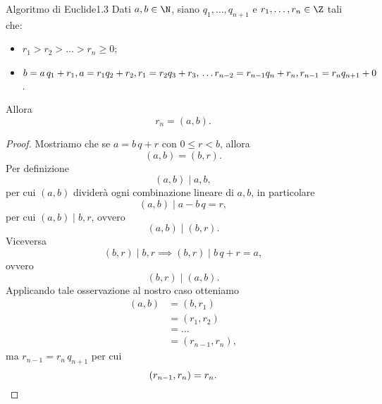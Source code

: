\begin{prop}{Algoritmo di Euclide}{1.3}
	Dati \(a,b\in\N\), siano \(q_1,\dots,q_{n+1}\) e \(r_1,\dots,r_n\in\Z\) tali che:
	\begin{itemize}
		\item \(r_1>r_2>\dots>r_n\ge 0\);
		\item \(b=a\,q_1+r_1,\\
		      a=r_1 q_2+r_2,\\
		      r_1=r_2 q_3+r_3,\\
		      \dots\\
		      r_{n-2}=r_{n-1}q_n+r_n,\\
		      r_{n-1}=r_n q_{n+1}+0\).
	\end{itemize}
	Allora
	\[
		r_n=(a,b).
	\]
\end{prop}

\begin{proof}
	Mostriamo che se \(a=b\,q+r\) con \(0\le r<b\), allora
	\[
		(a,b)=(b,r).
	\]
	Per definizione
	\[
		(a,b)\mid a,b,
	\]
	per cui \((a,b)\) dividerà ogni combinazione lineare di \(a,b\), in particolare
	\[
		(a,b)\mid a-b\,q=r,
	\]
	per cui \((a,b)\mid b,r\), ovvero
	\[
		(a,b)\mid (b,r).
	\]
	Viceversa
	\[
		(b,r)\mid b,r\implies (b,r)\mid b\,q+r=a,
	\]
	ovvero
	\[
		(b,r)\mid (a,b).
	\]
	Applicando tale osservazione al nostro caso otteniamo
	\[
		\begin{split}
			(a,b) & =(b,r_1)\\
			& =(r_1,r_2)\\
			& =\dots\\
			& =(r_{n-1},r_n),
		\end{split}
	\]
	ma \(r_{n-1}=r_n\,q_{n+1}\) per cui
	\[
		(r_{n-1},r_n)=r_n.\qedhere
	\]
\end{proof}

